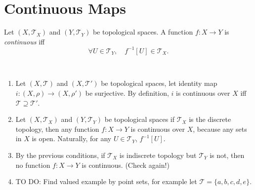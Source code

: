 \section{Continuous Maps}


\begin{definition}
	Let $(X, \mathcal T_X)$ and $(Y, \mathcal T_Y)$ be topological spaces. A function $f: X \to Y$ is \textit{continuous} iff
	$$
	\forall U \in \mathcal T_Y, \quad f^{-1}[U] \in \mathcal T_X.
	$$
\end{definition}


\begin{note} \
	\begin{enumerate}
		\item Let $(X, \mathcal T)$ and $(X, \mathcal T')$ be topological spaces, let identity map $i:(X, \rho) \to (X, \rho')$ be surjective. By definition, $i$ is continuous over $X$ iff $\mathcal T \supseteq \mathcal T'$.
		\item Let $(X, \mathcal T_X)$ and $(Y, \mathcal T_Y)$ be topological spaces if $\mathcal T_X$ is the discrete topology, then any function $f: X \to Y$ is continuous over $X$, because any sets in $X$ is open. Naturally, for any $U \in \mathcal T_Y$, $f^{-1}[U]$.
		\item By the previous conditions, if $\mathcal T_X$ is indiscrete topology but $\mathcal T_Y$ is not, then no function $f: X \to Y$ is continuous. (Check again!)
		\item TO DO: Find valued example by point sets, for example let $\mathcal T = \{a, b, c, d, e\}$.
	\end{enumerate}
\end{note}































%